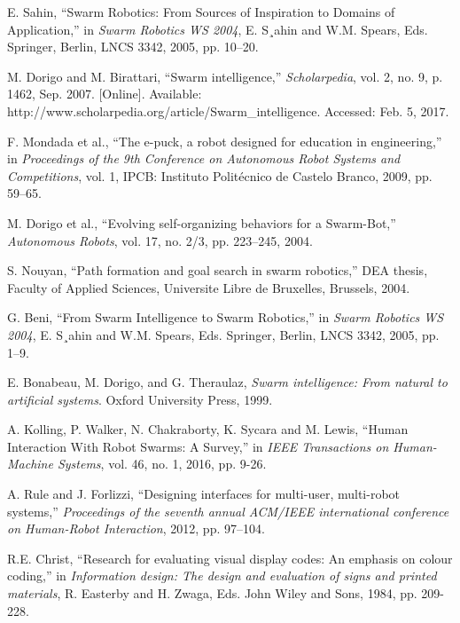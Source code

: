 \documentclass[titlepage,hidelinks,10pt]{article}
\begin{document}
\begin{thebibliography}{1}
 E. Sahin, ``Swarm Robotics: From Sources of Inspiration to Domains of Application,'' in \textit{Swarm Robotics WS 2004}, E. S¸ahin and W.M. Spears, Eds. Springer, Berlin, LNCS 3342, 2005, pp. 10–20.

 M. Dorigo and M. Birattari, ``Swarm intelligence,'' \textit{Scholarpedia}, vol. 2, no. 9, p. 1462, Sep. 2007. [Online]. Available: http://www.scholarpedia.org/article/Swarm\_intelligence. Accessed: Feb. 5, 2017.

 F. Mondada et al., ``The e-puck, a robot designed for education in engineering,'' in \textit{Proceedings of the 9th Conference on Autonomous Robot Systems and Competitions}, vol. 1, IPCB: Instituto Politécnico de Castelo Branco, 2009, pp. 59–65.

 M. Dorigo et al., ``Evolving self-organizing behaviors for a Swarm-Bot,'' \textit{Autonomous Robots}, vol. 17, no. 2/3, pp. 223–245, 2004.

 S. Nouyan, ``Path formation and goal search in swarm robotics,'' DEA thesis, Faculty of Applied Sciences, Universite Libre de Bruxelles, Brussels, 2004.

G. Beni, ``From Swarm Intelligence to Swarm Robotics,'' in \textit{Swarm Robotics WS 2004}, E. S¸ahin and W.M. Spears, Eds. Springer, Berlin, LNCS 3342, 2005, pp. 1–9.

 E. Bonabeau, M. Dorigo, and G. Theraulaz, \textit{Swarm intelligence: From natural to artificial systems}. Oxford University Press, 1999.

 A. Kolling, P. Walker, N. Chakraborty, K. Sycara and M. Lewis, ``Human Interaction With Robot Swarms: A Survey,'' in \textit{IEEE Transactions on Human-Machine Systems}, vol. 46, no. 1, 2016, pp. 9-26.

 A. Rule and J. Forlizzi, ``Designing interfaces for multi-user, multi-robot systems,'' \textit{Proceedings of the seventh annual ACM/IEEE international conference on Human-Robot Interaction}, 2012, pp. 97–104.

 R.E. Christ, ``Research for evaluating visual display codes: An emphasis on colour coding,'' in \textit{Information design: The design and evaluation of signs and printed materials}, R. Easterby and H. Zwaga, Eds. John Wiley and Sons, 1984, pp. 209-228.


\end{thebibliography}
\end{document}

